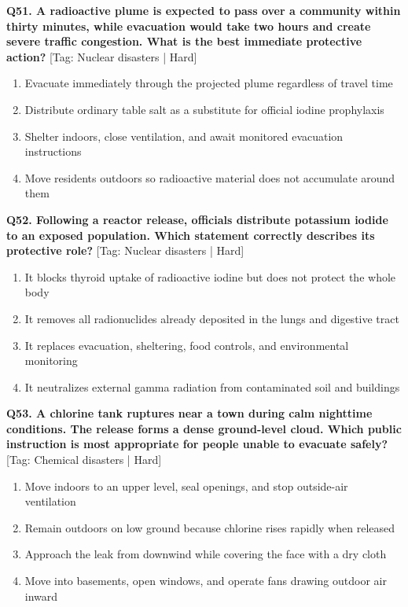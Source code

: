 \noindent\textbf{Q51. A radioactive plume is expected to pass over a community within thirty minutes, while evacuation would take two hours and create severe traffic congestion. What is the best immediate protective action?} \hfill [Tag: Nuclear disasters | Hard]
\begin{enumerate}[label=(\alph*),topsep=2pt,itemsep=1pt,partopsep=0pt,parsep=0pt]
    \item {Evacuate immediately through the projected plume regardless of travel time}
    \item {Distribute ordinary table salt as a substitute for official iodine prophylaxis}
    \item {Shelter indoors, close ventilation, and await monitored evacuation instructions}
    \item {Move residents outdoors so radioactive material does not accumulate around them}
\end{enumerate}
\vspace{2mm}

\noindent\textbf{Q52. Following a reactor release, officials distribute potassium iodide to an exposed population. Which statement correctly describes its protective role?} \hfill [Tag: Nuclear disasters | Hard]
\begin{enumerate}[label=(\alph*),topsep=2pt,itemsep=1pt,partopsep=0pt,parsep=0pt]
    \item {It blocks thyroid uptake of radioactive iodine but does not protect the whole body}
    \item {It removes all radionuclides already deposited in the lungs and digestive tract}
    \item {It replaces evacuation, sheltering, food controls, and environmental monitoring}
    \item {It neutralizes external gamma radiation from contaminated soil and buildings}
\end{enumerate}
\vspace{2mm}

\noindent\textbf{Q53. A chlorine tank ruptures near a town during calm nighttime conditions. The release forms a dense ground-level cloud. Which public instruction is most appropriate for people unable to evacuate safely?} \hfill [Tag: Chemical disasters | Hard]
\begin{enumerate}[label=(\alph*),topsep=2pt,itemsep=1pt,partopsep=0pt,parsep=0pt]
    \item {Move indoors to an upper level, seal openings, and stop outside-air ventilation}
    \item {Remain outdoors on low ground because chlorine rises rapidly when released}
    \item {Approach the leak from downwind while covering the face with a dry cloth}
    \item {Move into basements, open windows, and operate fans drawing outdoor air inward}
\end{enumerate}
\vspace{2mm}

